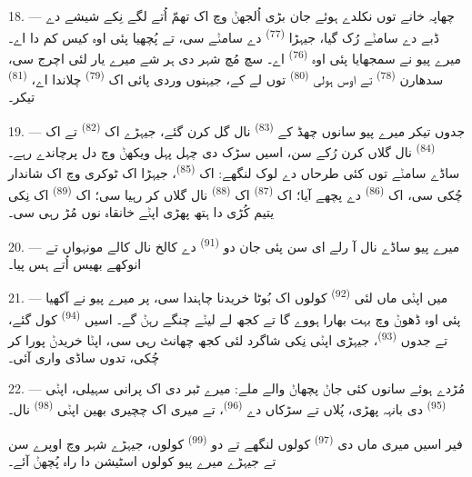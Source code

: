 \VUsaut{3.0mm}

18. --- چھاپہ خانے توں نکلدے ہوئے جان بڑی اُلجھݨ وچ اک تھمّ اُتے لگے نِکے شیشے دے
ڈبے دے سامݨے رُک گیا، جیہڑا  \textsuperscript{(77)} دے سامݨے سی،
تے پُچھیا پئی اوہ کیس کم دا اے۔ میرے پیو نے سمجھایا پئی اوہ 
\textsuperscript{(76)} اے۔ سچ مُچ شہر دی ہر شے میرے یار لئی اچرج سی، سدھارن
 \textsuperscript{(78)} تے اوس ہولی 
\textsuperscript{(80)} توں لے کے، جیہنوں وردی پائی اک 
\textsuperscript{(79)} چلاندا اے،  \textsuperscript{(81)} تیکر۔

19. --- جدوں تیکر میرے پیو سانوں چھڈ کے 
\textsuperscript{(83)} نال گل کرن گئے، جیہڑے اک  \textsuperscript{(82)}
تے اک  \textsuperscript{(84)} نال گلاں کرن رُکے سن، اسیں سڑک دی چہل پہل
ویکھݨ وچ دل پرچاندے رہے۔ ساڈے سامݨے توں کئی طرحاں دے لوک لنگھے: اک
 \textsuperscript{(85)}، جیہڑا اک ٹوکری وچ اک شاندار
 چُکی سی، اک  \textsuperscript{(86)} دے پچھے
آیا؛ اک  \textsuperscript{(87)} اک 
\textsuperscript{(88)} نال گلاں کر رہیا سی؛ اک  \textsuperscript{(89)}
اک نِکی یتیم کُڑی دا ہتھ پھڑی اپݨے خانقاہ نوں مُڑ رہی سی۔

\VUsaut{3.0mm}

20. --- میرے پیو ساڈے نال آ رلے ای سن پئی جان دو 
\textsuperscript{(91)} دے کالخ نال کالے مونہواں تے انوکھے بھیس اُتے ہس پیا۔

21. --- میں اپݨی ماں لئی  \textsuperscript{(92)} کولوں اک
بُوٹا خریدنا چاہندا سی، پر میرے پیو نے آکھیا پئی اوہ ڈھوݨ وچ بہت بھارا ہووے گا تے
کجھ  لے لیݨے چنگے رہݨ گے۔ اسیں  \textsuperscript{(94)}
کول گئے، تے جدوں  \textsuperscript{(93)}، جیہڑی اپݨی نِکی شاگرد لئی
کجھ چھانٹ رہی سی، اپݨا خریدݨ پورا کر چُکی، تدوں ساڈی واری آئی۔

22. --- مُڑدے ہوئے سانوں کئی جاݨ پچھاݨ والے ملے: میرے ٹبر دی اک پرانی سہیلی، اپݨی
 \textsuperscript{(95)} دی بانہہ پھڑی، پُلاں تے سڑکاں دے
 \textsuperscript{(96)}، تے میری اک چچیری بھین اپݨی 
\textsuperscript{(98)} نال۔

فیر اسیں میری ماں دی  \textsuperscript{(97)} کولوں لنگھے تے
دو  \textsuperscript{(99)} کولوں، جیہڑے شہر وچ اوپرے سن تے جیہڑے میرے
پیو کولوں اسٹیشن دا راہ پُچھݨ آئے۔
\VUsaut{6.0mm}
\VUfilet{22mm}
